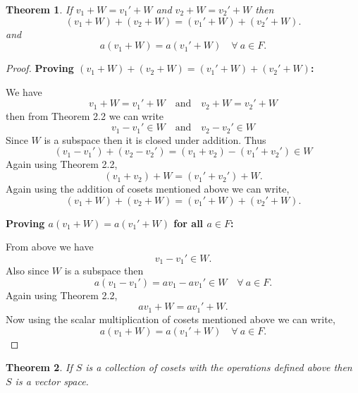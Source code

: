 \documentclass[12pt, a4paper]{article}
\newtheorem{theorem}{Theorem}[section]
\theoremstyle{definition}
\theoremstyle{remark}
\begin{document}
	\begin{theorem}
		If $v_1+W=v_1'+W$ and $v_2+W=v_2'+W$ then
		\[
		(v_1+W)+(v_2+W) = (v_1'+W)+(v_2'+W).
		\]
		and
		\[
		a(v_1+W) = a(v_1'+W) \quad \forall \ a \in F.
		\]
	\end{theorem}
	
	\begin{proof}
		\textbf{Proving $(v_1+W)+(v_2+W) = (v_1'+W)+(v_2'+W)$:}
		
		\vspace{0.3cm}
		
		\noindent We have 
		\[
		v_1+W=v_1'+W \quad \text{and} \quad v_2+W=v_2'+W
		\]
		then from Theorem 2.2 we can write
		\[
		v_1 - v_1' \in W \quad \text{and} \quad v_2 - v_2' \in W
		\]
		Since $W$ is a subspace then it is closed under addition. Thus
		\[
		(v_1 - v_1') + (v_2 - v_2') = (v_1 + v_2) - (v_1' + v_2') \in W
		\]
		Again using Theorem 2.2,
		\[
		(v_1+v_2)+W = (v_1'+v_2')+W.
		\]
		Again using the addition of cosets mentioned above we can write,
		\[
		(v_1+W)+(v_2+W) = (v_1'+W)+(v_2'+W).
		\]
		
		\vspace{0.3cm}
		
		\noindent \textbf{Proving $a(v_1+W) = a(v_1'+W)$ for all $a \in F$:}
		
		\vspace{0.3cm}
		
		\noindent From above we have\[v_1 - v_1' \in W.\]Also since $W$ is a subspace then
		\[
		a(v_1 - v_1') = av_1 - av_1' \in W \quad \forall \ a \in F.
		\]
		Again using Theorem 2.2,
		\[
		av_1+W = av_1'+W.
		\]
		Now using the scalar multiplication of cosets mentioned above we can write,
		\[
		a(v_1+W) = a(v_1'+W) \quad \forall \ a \in F.
		\]
	\end{proof}
	
	\begin{theorem}
		If $S$ is a collection of cosets with the operations defined above then $S$ is a vector space.
	\end{theorem}
	
\end{document}
